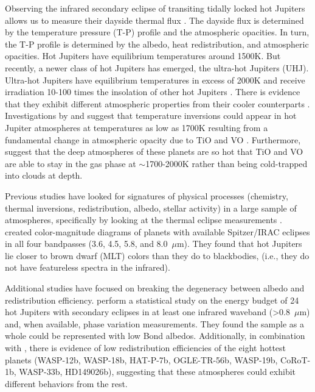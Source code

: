 Observing the infrared secondary eclipse of transiting tidally locked hot Jupiters allows us to measure their  dayside thermal flux \citep[e.g.,][]{Charbonneau2005, Deming2005, Cowan2011b,Cowan2011,Triaud2014b, Schwartz2015, Schwartz2017, Zhang2018,Garhart2020}. The dayside flux is determined by the temperature pressure (T-P) profile and the atmospheric opacities. In turn, the T-P profile is determined by the albedo, heat redistribution, and  atmospheric opacities.
Hot Jupiters have equilibrium temperatures around 1500K. But recently, a newer class of hot Jupiters has emerged, the ultra-hot Jupiters (UHJ). Ultra-hot Jupiters have equilibrium temperatures in excess of 2000K and receive irradiation 10-100 times the insolation of other hot Jupiters \citep[e.g., Figure 9.][]{Parmentier2018}. There is evidence that they exhibit different atmospheric properties from their cooler counterparts \citep[e.g.,][]{Bell2017, Arcangeli2018, Mansfield2018, Parmentier2018, Kreidberg2018}. Investigations by \citet{Hubeny2003, Fortney2006} and \citet{Fortney2008} suggest that temperature inversions could appear in hot Jupiter atmospheres at temperatures as low as 1700K resulting from a fundamental change in atmospheric opacity due to TiO and VO \citep{Gandhi2019}. Furthermore, \citet{Thorngren2019} suggest that the deep atmospheres of these planets are so hot that TiO and VO are able to stay in the gas phase at $\sim$1700-2000K rather than being cold-trapped into clouds at depth.

Previous studies have looked for signatures of physical processes (chemistry, thermal inversions, redistribution, albedo, stellar activity) in a large sample of atmospheres, specifically by looking at the thermal eclipse measurements \citep{Knutson2010, Cowan2011, Triaud2014b, Schwartz2015, Schwartz2017, Zhang2018, Garhart2020, Keating2019, Melville2020}. \citet{Triaud2014b} created color-magnitude diagrams of planets with available Spitzer/IRAC eclipses in all four bandpasses (3.6, 4.5, 5.8, and 8.0~$\mu$m). They found that hot Jupiters lie closer to brown dwarf (MLT) colors than they do to blackbodies, (i.e., they do not have featureless spectra in the infrared).

Additional studies have focused on breaking the degeneracy between albedo and redistribution efficiency. \citet{Cowan2011b} perform a statistical study on the energy budget of 24 hot Jupiters with secondary eclipses in at least one infrared waveband (>0.8~$\mu$m) and, when available, phase variation measurements. They found the sample as a whole could be represented with low Bond albedos. Additionally, in combination with \citet{Zhang2018}, there is evidence of low redistribution efficiencies of the eight hottest planets (WASP-12b, WASP-18b, HAT-P-7b, OGLE-TR-56b, WASP-19b, CoRoT-1b, WASP-33b, HD149026b), suggesting that these atmospheres could exhibit different behaviors from the rest.

